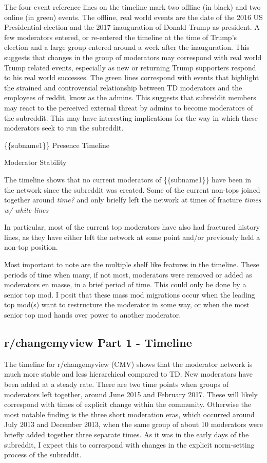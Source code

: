 \documentclass[11pt]{article}
\begin{document}
The four event reference lines on the timeline mark two offline (in
black) and two online (in green) events. The offline, real world events
are the date of the 2016 US Presidential election and the 2017
inauguration of Donald Trump as president. A few moderators entered, or
re-entered the timeline at the time of Trump's election and a large
group entered around a week after the inauguration. This suggests that
changes in the group of moderators may correspond with real world Trump
related events, especially as new or returning Trump supporters respond
to his real world successes. The green lines correspond with events that
highlight the strained and controversial relationship between TD
moderators and the employees of reddit, know as the admins. This
suggests that subreddit members may react to the perceived external
threat by admins to become moderators of the subreddit. This may have
interesting implications for the way in which these moderators seek to
run the subreddit.

\{\{subname1\}\} Presence Timeline

Moderator Stability

The timeline shows that no current moderators of \{\{subname1\}\} have
been in the network since the subreddit was created. Some of the current
non-tops joined together around \emph{time?} and only brielfy left the
network at times of fracture \emph{times w/ white lines}

In particular, most of the current top moderators have also had
fractured history lines, as they have either left the network at some
point and/or previously held a non-top position.

Most important to note are the multiple shelf like features in the
timeline. These periods of time when many, if not most, moderators were
removed or added as moderators en masse, in a brief period of time. This
could only be done by a senior top mod. I posit that these mass mod
migrations occur when the leading top mod(s) want to restructure the
moderator in some way, or when the most senior top mod hands over power
to another moderator.

    \subsection{r/changemyview Part 1 -
Timeline}\label{rchangemyview-part-1---timeline}

The timeline for r/changemyview (CMV) shows that the moderator network
is much more stable and less hierarchical compared to TD. New moderators
have been added at a steady rate. There are two time points when groups
of moderators left together, around June 2015 and February 2017. These
will likely correspond with times of explicit change within the
community. Otherwise the most notable finding is the three short
moderation eras, which occurred around July 2013 and December 2013, when
the same group of about 10 moderators were briefly added together three
separate times. As it was in the early days of the subreddit, I expect
this to correspond with changes in the explicit norm-setting process of
the subreddit.
\end{document}
